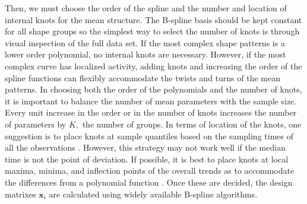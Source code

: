 \documentclass[12pt]{article}
\newcommand{\B}[0]{\mathbf}
\begin{document}
Then, we must choose the order of the spline and the number and location of internal knots for the mean structure. The B-spline basis should be kept constant for all shape groups so the simplest way to select the number of knots is through visual inspection of the full data set. If the most complex shape patterns is a lower order polynomial, no internal knots are necessary. However, if the most complex curve has localized activity, adding knots and increasing the order of the spline functions can flexibly accommodate the twists and turns of the mean patterns. In choosing both the order of the polynomials and the number of knots, it is important to balance the number of mean parameters with the sample size. Every unit increase in the order or in the number of knots increases the number of parameters by $K,$ the number of groups. In terms of location of the knots, one suggestion is to place knots at sample quantiles based on the sampling times of all the observations \cite{ruppert2002}. However, this strategy may not work well if the median time is not the point of deviation. If possible, it is best to place knots at local maxima, minima, and inflection points of the overall trends as to accommodate the differences from a polynomial function \cite{eubank1999}.  Once these are decided, the design matrixes $\B x_{i}$ are calculated using widely available B-spline algorithms. 
\end{document}
